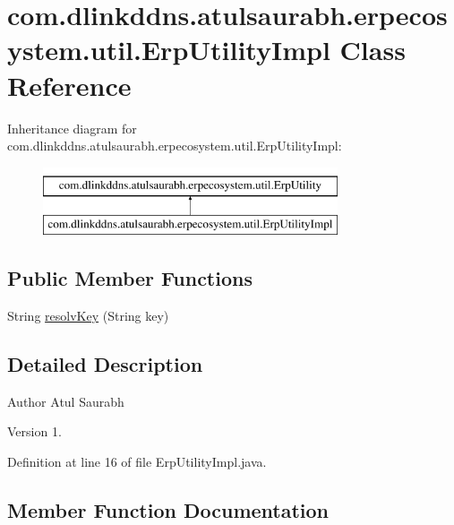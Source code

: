 \hypertarget{classcom_1_1dlinkddns_1_1atulsaurabh_1_1erpecosystem_1_1util_1_1_erp_utility_impl}{}\section{com.\+dlinkddns.\+atulsaurabh.\+erpecosystem.\+util.\+Erp\+Utility\+Impl Class Reference}
\label{classcom_1_1dlinkddns_1_1atulsaurabh_1_1erpecosystem_1_1util_1_1_erp_utility_impl}
Inheritance diagram for com.\+dlinkddns.\+atulsaurabh.\+erpecosystem.\+util.\+Erp\+Utility\+Impl\+:\begin{figure}[H]
\begin{center}
\leavevmode
\includegraphics[height=2.000000cm]{classcom_1_1dlinkddns_1_1atulsaurabh_1_1erpecosystem_1_1util_1_1_erp_utility_impl}
\end{center}
\end{figure}
\subsection*{Public Member Functions}
\begin{DoxyCompactItemize}
\item 
String \mbox{\hyperlink{classcom_1_1dlinkddns_1_1atulsaurabh_1_1erpecosystem_1_1util_1_1_erp_utility_impl_af2cfed2c5aca189be0e160b0610f2644}{resolv\+Key}} (String key)
\end{DoxyCompactItemize}


\subsection{Detailed Description}
\begin{DoxyAuthor}{Author}
Atul Saurabh 
\end{DoxyAuthor}
\begin{DoxyVersion}{Version}
1. 
\end{DoxyVersion}


Definition at line 16 of file Erp\+Utility\+Impl.\+java.



\subsection{Member Function Documentation}
\mbox{\label{classcom_1_1dlinkddns_1_1atulsaurabh_1_1erpecosystem_1_1util_1_1_erp_utility_impl_af2cfed2c5aca189be0e160b0610f2644}} 
